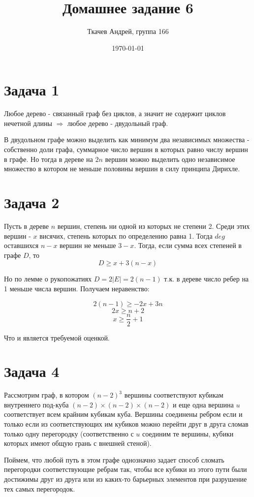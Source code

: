 \documentclass{article}
\title{Домашнее задание 6}
\author{Ткачев Андрей, группа 166}
\date{\today}
\begin{document}
	\maketitle
	
	\section{Задача 1}
	Любое дерево - связанный граф без циклов, а значит не содержит циклов нечетной длины $\Rightarrow$ любое дерево - двудольный граф. 
		
	В двудольном графе можно выделить как минимум два независимых множества - собственно доли графа, суммарное число вершин в которых равно числу вершин в графе. Но тогда в дереве на $2n$ вершин можно выделить одно независимое множество в котором не меньше половины вершин в силу принципа Дирихле.
	
	\section{Задача 2}
	Пусть в дереве $n$ вершин, степень ни одной из которых не степени 2. Среди этих вершин - $x$ висячих, степень которых по определению равна 1. Тогда $deg$ оставшихся $n - x$ вершин не меньше $3 - x$. Тогда, если сумма всех степеней в графе $D$, то
	$$ D \geqslant x  + 3(n - x)$$
	
	Но по лемме о рукопожатиях $D = 2|E| = 2(n - 1)$ т.к. в дереве число ребер на 1 меньше числа вершин. Получаем неравенство:
	
	$$ 2(n - 1) \geqslant -2x + 3n$$
	$$ 2x \geqslant n + 2$$
	$$ x \geqslant \frac{n}{2} + 1$$
	
	Что и является требуемой оценкой.
	
	\section{Задача 4}
	
	Рассмотрим граф, в котором $(n - 2)^3$ вершины соответствуют кубикам внутреннего под-куба $(n - 2) \times (n - 2) \times (n - 2)$ и еще одна вершина $u$ соответствует всем крайним кубикам куба. Вершины соединены ребром если и только если из соответствующих им кубиков можно перейти друг в друга сломав только одну перегородку (соответственно с $u$ соединим те вершины, кубики которых имеют общую грань с внешней стеной).
	
	Поймем, что любой путь в этом графе однозначно задает способ сломать перегородки соответствующие ребрам так, чтобы все кубики из этого пути были достижимы друг из друга или из каких-то барьерных элементов при разрушение тех самых перегородок. 
	
\end{document}

